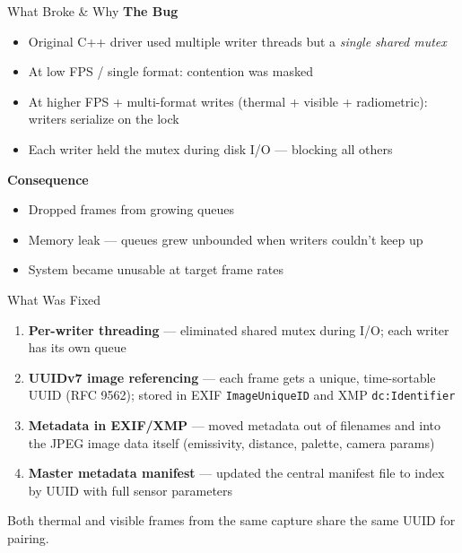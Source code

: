 \documentclass[10pt, aspectratio=169]{beamer}
\begin{document}
\begin{frame}{What Broke \& Why}
  \textbf{The Bug}
  \begin{itemize}
    \item Original C++ driver used multiple writer threads but a \textit{single shared mutex}
    \item At low FPS / single format: contention was masked
    \item At higher FPS + multi-format writes (thermal + visible + radiometric): writers serialize on the lock
    \item Each writer held the mutex during disk I/O --- blocking all others
  \end{itemize}

  \vspace{0.5em}
  \textbf{Consequence}
  \begin{itemize}
    \item Dropped frames from growing queues
    \item Memory leak --- queues grew unbounded when writers couldn't keep up
    \item System became unusable at target frame rates
  \end{itemize}
\end{frame}

\begin{frame}{What Was Fixed}
  \begin{enumerate}
    \item \textbf{Per-writer threading} --- eliminated shared mutex during I/O; each writer has its own queue
    \item \textbf{UUIDv7 image referencing} --- each frame gets a unique, time-sortable UUID (RFC 9562); stored in EXIF \texttt{ImageUniqueID} and XMP \texttt{dc:Identifier}
    \item \textbf{Metadata in EXIF/XMP} --- moved metadata out of filenames and into the JPEG image data itself (emissivity, distance, palette, camera params)
    \item \textbf{Master metadata manifest} --- updated the central manifest file to index by UUID with full sensor parameters
  \end{enumerate}

  \vspace{0.5em}
  Both thermal and visible frames from the same capture share the same UUID for pairing.
\end{frame}

\end{document}
